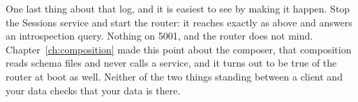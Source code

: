 %
One last thing about that log, and it is easiest to see by making it happen.
Stop the Sessions service and start the router: it reaches  exactly as above and answers an introspection query. Nothing on 5001,
and the router does not mind. Chapter~\ref{ch:composition} made this point about
the composer, that composition reads schema files and never calls a service, and
it turns out to be true of the router at boot as well. Neither of the two things
standing between a client and your data checks that your data is there.
%
